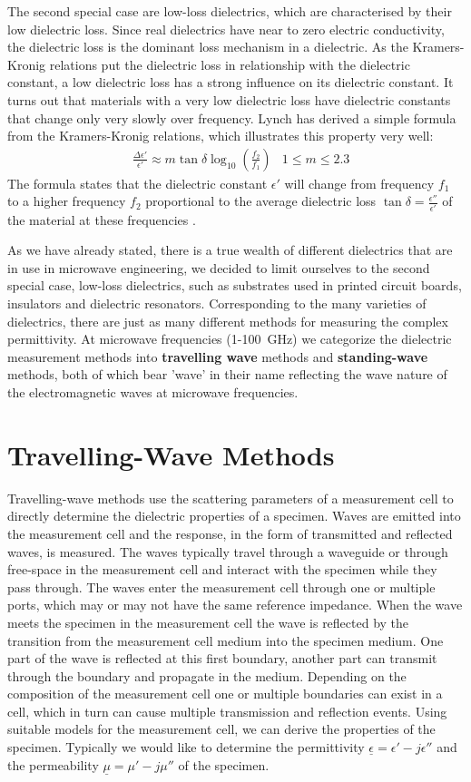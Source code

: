 The second special case are low-loss dielectrics, which are characterised by their low dielectric loss. Since real dielectrics have near to zero electric conductivity, the dielectric loss is the dominant loss mechanism in a dielectric. As the Kramers-Kronig relations put the dielectric loss in relationship with the dielectric constant, a low dielectric loss has a strong influence on its dielectric constant. It turns out that materials with a very low dielectric loss have dielectric constants that change only very slowly over frequency. Lynch has derived a simple formula from the Kramers-Kronig relations, which illustrates this property very well:
\begin{align*}
&\frac{\Delta\epsilon'}{\epsilon'}\approx m\tan\delta\log_{10}\left(\frac{f_2}{f_1}\right)  & 1\leq m\leq 2.3
\end{align*}
The formula states that the dielectric constant $\epsilon'$ will change from frequency $f_1$ to a higher frequency $f_2$ proportional to the average dielectric loss $\tan\delta=\frac{\epsilon''}{\epsilon'}$ of the material at these frequencies \cite{NPL}.

As we have already stated, there is a true wealth of different dielectrics that are in use in microwave engineering, we decided to limit ourselves to the second special case, low-loss dielectrics, such as substrates used in printed circuit boards, insulators and dielectric resonators. Corresponding to the many varieties of dielectrics, there are just as many different methods for measuring the complex permittivity. At microwave frequencies (1-\SI{100}{\giga\hertz}) we categorize the dielectric measurement methods into \textbf{travelling wave} methods and \textbf{standing-wave} methods, both of which bear 'wave' in their name reflecting the wave nature of the electromagnetic waves at microwave frequencies.
\section{Travelling-Wave Methods}
Travelling-wave methods use the scattering parameters of a measurement cell to directly determine the dielectric properties of a specimen. Waves are emitted into the measurement cell and the response, in the form of transmitted and reflected waves, is measured. The waves typically travel through a waveguide or through free-space in the measurement cell and interact with the specimen while they pass through. The waves enter the measurement cell through one or multiple ports, which may or may not have the same reference impedance. When the wave meets the specimen in the measurement cell the wave is reflected by the transition from the measurement cell medium into the specimen medium. One part of the wave is reflected at this first boundary, another part can transmit through the boundary and propagate in the medium. Depending on the composition of the measurement cell one or multiple boundaries can exist in a cell, which in turn can cause multiple transmission and reflection events. Using suitable models for the measurement cell, we can derive the properties of the specimen. Typically we would like to determine the permittivity $\underline{\epsilon}=\epsilon'-j\epsilon''$ and the permeability $\underline{\mu}=\mu'-j\mu''$ of the specimen. 

